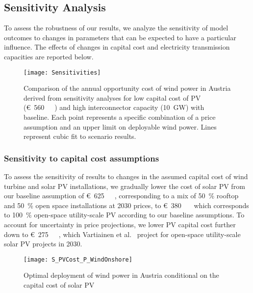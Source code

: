 \documentclass[review, 3p, times, 12pt, authoryear]{elsarticle}
\begin{document}
    \subsection{Sensitivity Analysis} \label{subsec:sensitivity}
    To assess the robustness of our results, we analyze the sensitivity of model outcomes to changes in parameters that can be expected to have a particular influence. The effects of changes in capital cost and electricity transmission capacities are reported below.

    \begin{figure}[h!t]
        \centering
        \texttt{[image: Sensitivities]}
        \caption{Comparison of the annual opportunity cost of wind power in Austria derived from sensitivity analyses for low capital cost of PV (\SI[per-mode=symbol,sticky-per, bracket-unit-denominator=false]{560}[\euro]{\per\kilo\wattpeak}) and high interconnector capacity (\SI{10}{\giga\watt}) with baseline. Each point represents a specific combination of a  price assumption and an upper limit on deployable wind power. Lines represent cubic fit to scenario results.}
        \label{fig:sensitivity}
    \end{figure}

    \subsubsection{Sensitivity to capital cost assumptions}
    To assess the sensitivity of results to changes in the assumed capital cost of wind turbine and solar PV installations, we gradually lower the cost of solar PV from our baseline assumption of \SI[per-mode=symbol,sticky-per, bracket-unit-denominator=false]{625}[\euro]{\per\kilo\wattpeak}, corresponding to a mix of \SI{50}{\percent} rooftop and \SI{50}{\percent} open space installations at 2030 prices, to \SI[per-mode=symbol,sticky-per, bracket-unit-denominator=false]{380}[\euro]{\per\kilo\wattpeak} which corresponds to \SI{100}{\percent} open-space utility-scale PV according to our baseline assumptions.
    To account for uncertainty in price projections, we lower PV capital cost further down to \SI[per-mode=symbol,sticky-per, bracket-unit-denominator=false]{275}[\euro]{\per\kilo\wattpeak}, which Vartiainen et al.~\cite{Vartiainen2019} project for open-space utility-scale solar PV projects in 2030.

    \begin{figure}[h!t]
        \centering
        \texttt{[image: S\_PVCost\_P\_WindOnshore]}
        \caption{Optimal deployment of wind power in Austria conditional on the capital cost of solar PV}
        \label{fig:opt_wind_cap}
    \end{figure}
\end{document}
